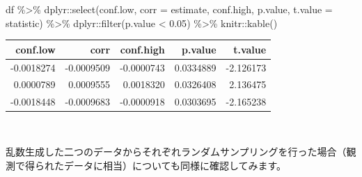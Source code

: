 \documentclass[]{tufte-handout}
\newenvironment{Shaded}{}{}
\newcommand{\AttributeTok}[1]{\textcolor[rgb]{0.49,0.56,0.16}{#1}}
\newcommand{\FloatTok}[1]{\textcolor[rgb]{0.25,0.63,0.44}{#1}}
\newcommand{\FunctionTok}[1]{\textcolor[rgb]{0.02,0.16,0.49}{#1}}
\newcommand{\NormalTok}[1]{#1}
\newcommand{\SpecialCharTok}[1]{\textcolor[rgb]{0.25,0.44,0.63}{#1}}
\begin{document}
\begin{Shaded}
\begin{Highlighting}[numbers=left,,]
\NormalTok{df }\SpecialCharTok{\%\textgreater{}\%} 
\NormalTok{  dplyr}\SpecialCharTok{::}\FunctionTok{select}\NormalTok{(conf.low, }\AttributeTok{corr =}\NormalTok{ estimate, conf.high,}
\NormalTok{                p.value, }\AttributeTok{t.value =}\NormalTok{ statistic) }\SpecialCharTok{\%\textgreater{}\%} 
\NormalTok{  dplyr}\SpecialCharTok{::}\FunctionTok{filter}\NormalTok{(p.value }\SpecialCharTok{\textless{}} \FloatTok{0.05}\NormalTok{) }\SpecialCharTok{\%\textgreater{}\%} 
\NormalTok{  knitr}\SpecialCharTok{::}\FunctionTok{kable}\NormalTok{()}
\end{Highlighting}
\end{Shaded}

\begin{longtable}[]{@{}rrrrr@{}}
\toprule
conf.low & corr & conf.high & p.value & t.value \\
\midrule
\endhead
-0.0018274 & -0.0009509 & -0.0000743 & 0.0334889 & -2.126173 \\
0.0000789 & 0.0009555 & 0.0018320 & 0.0326408 & 2.136475 \\
-0.0018448 & -0.0009683 & -0.0000918 & 0.0303695 & -2.165238 \\
\bottomrule
\end{longtable}

　

乱数生成した二つのデータからそれぞれランダムサンプリングを行った場合（観測で得られたデータに相当）についても同様に確認してみます。
\end{document}
